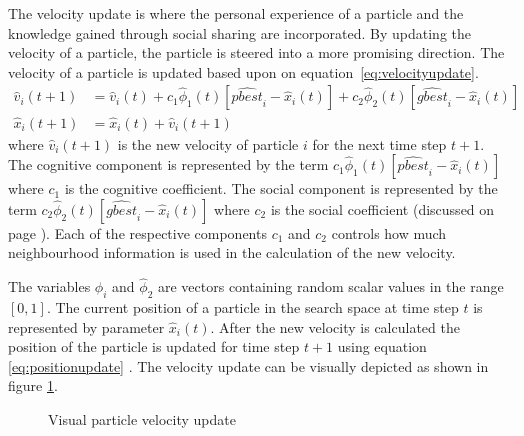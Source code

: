 The velocity update is where the personal experience of a particle and the knowledge gained through social sharing are incorporated. By updating the velocity of a particle, the particle is steered into a more promising direction. The velocity of a particle is updated based upon on equation~\ref{eq:velocityupdate}.
\begin{align}
\hat{v}_i(t+1) &= \hat{v}_i(t) + c_1\hat{\phi}_1(t)[\hat{pbest}_i - \hat{x}_i(t)] + c_2\hat{\phi}_2(t)[\hat{gbest}_i - \hat{x}_i(t)]\label{eq:velocityupdate}\\
\hat{x}_i(t+1) &= \hat{x}_i(t) + \hat{v}_i(t+1)\label{eq:positionupdate}
\end{align}
where $\hat{v}_i(t+1)$ is the new velocity of particle $i$ for the next time step $t+1$. The cognitive component is represented by the term $c_1\hat{\phi}_1(t)[\hat{pbest}_i - \hat{x}_i(t)]$ where $c_1$ is the cognitive coefficient. The social component is represented by the term $c_2\hat{\phi}_2(t)[\hat{gbest}_i - \hat{x}_i(t)]$ where $c_2$ is the social coefficient (discussed on page \pageref{def:cognitivecomponent})\cite{FundamentalSwarm,CompuIntelligenceIntro}. Each of the respective components $c_1$ and $c_2$ controls how much neighbourhood information is used in the calculation of the new velocity. 

The variables $\hat{\phi}_i$ and $\hat{\phi}_2$ are vectors containing random scalar values in the range $[0,1]$. The current position of a particle in the search space at time step $t$ is represented by parameter $\hat{x}_i(t)$\cite{FundamentalSwarm,CompuIntelligenceIntro}. After the new velocity is calculated the position of the particle is updated for time step $t+1$ using equation \ref{eq:positionupdate} \cite{FundamentalSwarm,CompuIntelligenceIntro}. The velocity update can be visually depicted as shown in figure \ref{fig:particleVelocityUpdate}. 
\begin{figure}[H]
	\begin{center}
	\caption{Visual particle velocity update \cite{SOSwarm,FundamentalSwarm,CompuIntelligenceIntro,PSOSelfHierarch}}
	\label{fig:particleVelocityUpdate}
	\end{center}
\end{figure}

